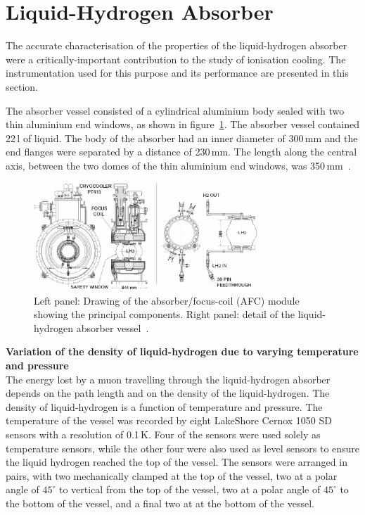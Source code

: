 \graphicspath{{07-Absorber/Figures/}}

\section{Liquid-Hydrogen Absorber}
\label{Sect:Absorber}

The accurate characterisation of the properties of the liquid-hydrogen
absorber were a critically-important contribution to the study of
ionisation cooling.
The instrumentation used for this purpose and its performance are
presented in this section.

The absorber vessel consisted of a cylindrical aluminium body sealed
with two thin aluminium end windows, as shown in
figure~\ref{Fig:AbsorberVessel:Diag}.
The absorber vessel contained 22\,l of liquid.
The body of the absorber had an inner diameter of 300\,mm and the end
flanges were separated by a distance of 230\,mm.  
The length along the central axis, between the two domes of the thin
aluminium end windows, was 350\,mm~\cite{1748-0221-13-09-T09008}. \\
\begin{figure}
  \begin{center}
    \includegraphics[width=0.75\textwidth]{AFC-drwng.pdf}
  \end{center}
  \caption{
    Left panel: Drawing of the absorber/focus-coil (AFC) module
    showing the principal components.
    Right panel: detail of the liquid-hydrogen absorber vessel~\cite{1748-0221-13-09-T09008}.
  }
  \label{Fig:AbsorberVessel:Diag}
\end{figure}

\noindent\textbf{Variation of the density of liquid-hydrogen due to
    varying temperature and pressure} \\
\noindent
The energy lost by a muon travelling through the liquid-hydrogen
absorber depends on the path length and on
the density of the liquid-hydrogen. The density of liquid-hydrogen is
a function of temperature and pressure.  
The temperature of the vessel was recorded by eight LakeShore Cernox
1050 SD sensors with a resolution of 0.1\,K. 
Four of the sensors were used solely as temperature sensors, while the
other four were also used as level sensors to ensure the
liquid hydrogen reached the top of the vessel. 
The sensors were arranged in pairs, with two mechanically clamped at
the top of the vessel, two at a polar angle of ${45}^{\circ}$ to
vertical from the top of the vessel, two at a polar angle of
${45}^{\circ}$ to the bottom of the vessel, and a
final two at at the bottom of the vessel. 

